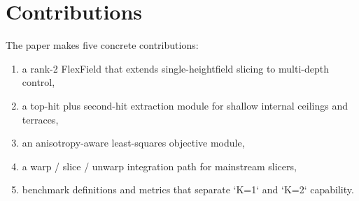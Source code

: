 \section{Contributions}

The paper makes five concrete contributions:

\begin{enumerate}
\item a rank-2 FlexField that extends single-heightfield slicing to multi-depth control,
\item a top-hit plus second-hit extraction module for shallow internal ceilings and terraces,
\item an anisotropy-aware least-squares objective module,
\item a warp / slice / unwarp integration path for mainstream slicers,
\item benchmark definitions and metrics that separate `K=1` and `K=2` capability.
\end{enumerate}

